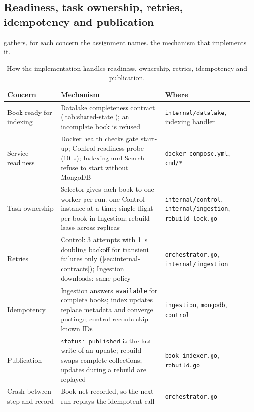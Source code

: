 \documentclass[10pt,a4paper]{article}
\newcommand{\code}[1]{\texttt{#1}}
\begin{document}
\subsection{Readiness, task ownership, retries, idempotency and publication}
\label{sec:readiness}

 gathers, for each concern the assignment names, the
mechanism that implements it.

\begin{table}[htbp]
  \centering
  \footnotesize
  \caption{How the implementation handles readiness, ownership, retries,
  idempotency and publication.}
  \label{tab:mechanisms}
  \begin{tabularx}{\textwidth}{@{}>{\raggedright\arraybackslash}p{2.75cm}>{\raggedright\arraybackslash}X>{\raggedright\arraybackslash}p{3.5cm}@{}}
    \toprule
    Concern & Mechanism & Where \\
    \midrule
    Book ready for indexing & Datalake completeness contract
      (\cref{tab:shared-state}); an incomplete book is refused &
      \code{internal/datalake}, indexing handler \\
    Service readiness & Docker health checks gate start-up; Control readiness
      probe (10~s); Indexing and Search refuse to start without MongoDB &
      \code{docker-compose.yml}, \code{cmd/*} \\
    Task ownership & Selector gives each book to one worker per run; one
      Control instance at a time; single-flight per book in Ingestion; rebuild
      lease across replicas & \code{internal/control},
      \code{internal/ingestion}, \code{rebuild\_lock.go} \\
    Retries & Control: 3 attempts with 1~s doubling backoff for transient
      failures only (\cref{sec:internal-contracts}); Ingestion downloads: same
      policy &
      \code{orchestrator.go}, \code{internal/ingestion} \\
    Idempotency & Ingestion answers \code{available} for complete books;
      index updates replace metadata and converge postings; control records
      skip known IDs & \code{ingestion}, \code{mongodb}, \code{control} \\
    Publication & \code{status: published} is the last write of an update;
      rebuild swaps complete collections; updates during a rebuild are replayed
      & \code{book\_indexer.go}, \code{rebuild.go} \\
    Crash between step and record & Book not recorded, so the next run replays
      the idempotent call & \code{orchestrator.go} \\
    \bottomrule
  \end{tabularx}
\end{table}
\end{document}
